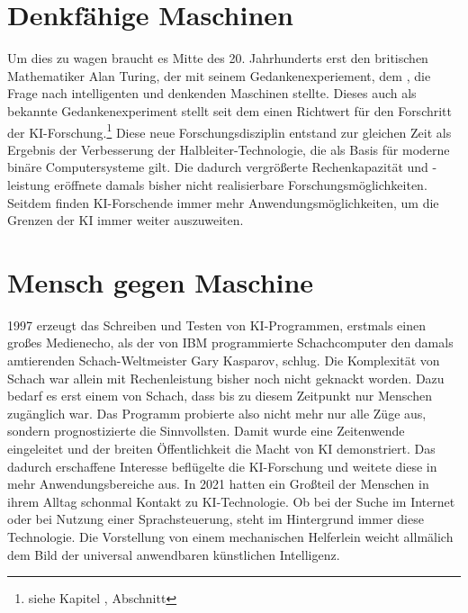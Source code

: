 \documentclass[12pt,german,ngerman]{report}
\begin{document}
    \section{Denkfähige Maschinen}
        Um dies zu wagen braucht es Mitte des 20. Jahrhunderts erst den britischen Mathematiker Alan Turing, 
        der mit seinem Gedankenexperiement, dem , 
        die Frage nach intelligenten und denkenden Maschinen stellte.
        Dieses auch als  bekannte Gedankenexperiment stellt seit dem einen 
        Richtwert für den Forschritt der KI-Forschung.\footnote{siehe Kapitel , Abschnitt }
        Diese neue Forschungsdisziplin entstand zur gleichen Zeit als Ergebnis 
        der Verbesserung der Halbleiter-Technologie, die als Basis für 
        moderne binäre Computersysteme gilt. Die dadurch vergrößerte Rechenkapazität und -leistung 
        eröffnete damals bisher nicht realisierbare Forschungsmöglichkeiten. 
        Seitdem finden KI-Forschende immer mehr Anwendungsmöglichkeiten, um die Grenzen der KI immer weiter auszuweiten.
    
    \section{Mensch gegen Maschine}
        1997 erzeugt das Schreiben und Testen von KI-Programmen, erstmals einen großes Medienecho, 
        als der von IBM programmierte Schachcomputer
         den damals amtierenden Schach-Weltmeister Gary Kasparov, schlug.\cite{chessbase2017kasparovdeepblue} 
        Die Komplexität von Schach war allein mit 
        Rechenleistung bisher noch nicht geknackt worden. Dazu bedarf es erst einem  von Schach, dass bis zu diesem
        Zeitpunkt nur Menschen zugänglich war. Das Programm probierte also nicht mehr nur alle Züge aus, sondern prognostizierte die 
        Sinnvollsten. Damit wurde eine Zeitenwende eingeleitet und der breiten Öffentlichkeit die Macht von KI demonstriert.
        Das dadurch erschaffene Interesse beflügelte die KI-Forschung und weitete diese in mehr Anwendungsbereiche aus.
        In 2021 hatten ein Großteil der Menschen in ihrem Alltag schonmal Kontakt zu KI-Technologie. 
        Ob bei der Suche im Internet oder bei Nutzung einer Sprachsteuerung, steht im Hintergrund immer diese Technologie.
        Die Vorstellung von einem mechanischen Helferlein weicht allmälich dem Bild der universal anwendbaren künstlichen Intelligenz.
        
\end{document}
